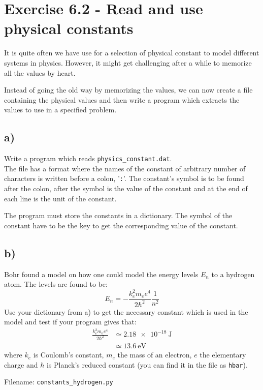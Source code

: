 \documentclass[10pt,a4paper]{article}
\begin{document}
\section*{Exercise 6.2 - Read and use physical constants}

It is quite often we have use for a selection of physical constant to model different systems in physics. However, it might get challenging after a while to memorize all the values by heart. 

Instead of going the old way by memorizing the values, we can now create a file containing the physical values and then write a program which extracts the values to use in a specified problem. 

\subsection*{a)}
Write a program which reads \texttt{physics\_constant.dat}. \\
The file has a format where the names of the constant of arbitrary number of characters is written before a colon, '\texttt{:}'. The constant's symbol is to be found after the colon, after the symbol is the value of the constant and at the end of each line is the unit of the constant. 

The program must store the constants in a dictionary. The symbol of the constant have to be the key to get the corresponding value of the constant. 

\subsection*{b)}
Bohr found a model on how one could model the energy levels $E_n$ to a hydrogen atom. The levels are found to be:
\[
E_n =  -\frac{k_e^2m_ee^4}{2\hbar^2} \frac{1}{n^2}
\]
Use your dictionary from a) to get the necessary constant which is used in the model and test if your program gives that:
\begin{align*}
\frac{k_e^2m_ee^4}{2\hbar^2} &\simeq \SI{2.18e-18}{\joule}\\
&\simeq \SI{13.6}{\electronvolt} 
\end{align*}
where $k_e$ is Coulomb's constant, $m_e$ the mass of an electron, $e$ the elementary charge and $\hbar$ is Planck's reduced constant (you can find it in the file as \texttt{hbar}).

Filename: \texttt{constants\_hydrogen.py}
\end{document}
